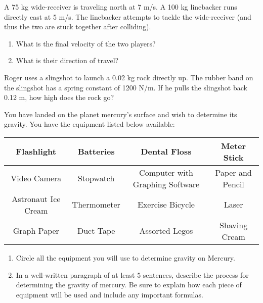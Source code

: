 \documentclass[10pt]{examdesign}
\begin{document}
\begin{shortanswer}[title={Free Response}, rearrange=NO]

	
	\begin{question}
		A 75 kg wide-receiver is traveling north at 7 m/s.  A 100 kg linebacker runs directly east at 5 m/s. The linebacker attempts to tackle the wide-receiver (and thus the two are stuck together after colliding). 
		\begin{enumerate}
			\item What is the final velocity of the two players?  
			\vspace{.75in}
			\item What is their direction of travel?
			\word{{\vspace{.5in}}{\vspace{.75in}}}
			
		\end{enumerate}
	\end{question}

	\begin{question}
	Roger uses a slingshot to launch a 0.02 kg rock directly up.  The rubber band on the slingshot has a  spring constant of 1200 N/m.  If he pulls the slingshot back 0.12 m, how high does the rock go?
	\word{{\vspace{1.2in}}{\vspace{.75in}}}
	
	\end{question}


	\begin{question}
	You have landed on the planet mercury's surface and wish to determine its gravity.  You have the equipment listed below available:
	\begin{center}
	\begin{tabular}{|c|c|c|c|}
		\hline
		Flashlight & Batteries & Dental Floss & Meter Stick \\
		\hline
		Video Camera & Stopwatch & Computer with Graphing Software & Paper and Pencil \\
		\hline
		Astronaut Ice Cream & Thermometer & Exercise Bicycle & Laser\\
		\hline
		Graph Paper & Duct Tape & Assorted Legos & Shaving Cream \\
		\hline

		 
	\end{tabular}  
	\end{center}	
	\begin{enumerate} 
		\item Circle all the equipment you will use to determine gravity on Mercury.
		\item In a well-written paragraph of at least 5 sentences, describe the process for determining the gravity of mercury.  Be sure to explain how each piece of equipment will be used and include any important formulas.
				\vspace{2 in}
	\end{enumerate}
	\end{question}



\end{shortanswer}
\end{document}
